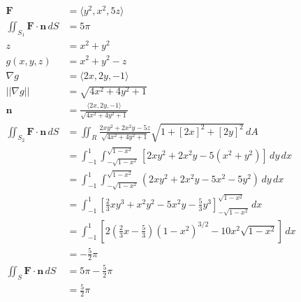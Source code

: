 \documentclass{article}
\begin{document}
\begin{align*}
  \mathbf{F}                                   & = \langle y^2, x^2, 5 z \rangle                                                                                              \\
  \iint_{S_1} \mathbf{F} \cdot \mathbf{n} \,dS & = 5 \pi                                                                                                                      \\
  z                                            & = x^2 +y^2                                                                                                                   \\
  g(x, y, z)                                   & = x^2 + y^2 - z                                                                                                              \\
  \nabla g                                     & = \langle 2 x, 2 y, -1 \rangle                                                                                               \\
  ||\nabla g||                                 & = \sqrt{4 x^2 + 4 y^2 + 1}                                                                                                   \\
  \mathbf{n}                                   & = \frac{\langle 2 x, 2 y, -1 \rangle}{\sqrt{4 x^2 + 4 y^2 + 1}}                                                              \\
  \iint_{S_2} \mathbf{F} \cdot \mathbf{n} \,dS & = \iint_R \frac{2 x y^2 + 2 x^2 y - 5 z}{\sqrt{4 x^2 + 4 y^2 + 1}} \sqrt{1 + [2 x]^2 + [2 y]^2} \,dA                         \\
                                               & = \int_{-1}^1 \int_{-\sqrt{1 - x^2}}^{\sqrt{1 - x^2}} [2 x y^2 + 2 x^2 y - 5 (x^2 + y^2)] \,dy \,dx                          \\
                                               & = \int_{-1}^1 \int_{-\sqrt{1 - x^2}}^{\sqrt{1 - x^2}} (2 x y^2 + 2 x^2 y - 5 x^2 - 5 y^2) \,dy \,dx                          \\
                                               & = \int_{-1}^1 \left[ \frac{2}{3} x y^3 + x^2 y^2 - 5 x^2 y - \frac{5}{3} y^3 \right]_{-\sqrt{1 - x^2}}^{\sqrt{1 - x^2}} \,dx \\
                                               & = \int_{-1}^1 \left[ 2 \left( \frac{2}{3} x - \frac{5}{3} \right) (1 - x^2)^{3 / 2} - 10 x^2 \sqrt{1 - x^2} \right] \,dx     \\
                                               & = -\frac{5}{2} \pi                                                                                                           \\
  \iint_S \mathbf{F} \cdot \mathbf{n} \,dS     & = 5 \pi - \frac{5}{2} \pi                                                                                                    \\
                                               & = \frac{5}{2} \pi
\end{align*}
\end{document}
